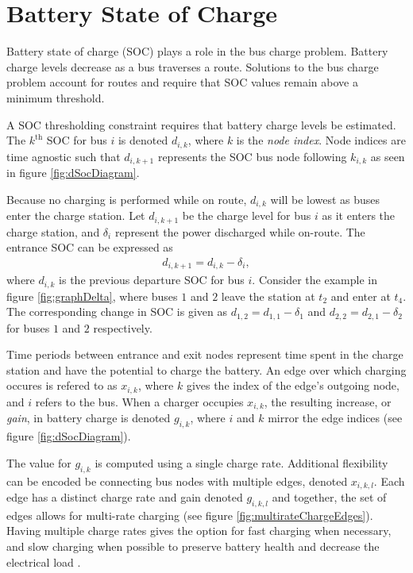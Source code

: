 \section{Battery State of Charge}
Battery state of charge (SOC) plays a role in the bus charge problem. Battery charge levels decrease as a bus traverses a route. Solutions to the bus charge problem account for routes and require that SOC values remain above a minimum threshold. 
\par A SOC thresholding constraint requires that battery charge levels be estimated. The $k^{\text{th}}$ SOC for bus $i$ is denoted $d_{i,k}$, where $k$ is the \textit{node index}. Node indices are time agnostic such that $d_{i,k+1}$ represents the SOC bus node following $k_{i,k}$ as seen in figure \ref{fig:dSocDiagram}. 
\par Because no charging is performed while on route, $d_{i,k}$ will be lowest as buses enter the charge station. Let $d_{i,k+1}$ be the charge level for bus $i$ as it enters the charge station, and $\delta_i$ represent the power discharged while on-route. The entrance SOC can be expressed as 
\begin{align}
	d_{i,k+1} = d_{i,k} - \delta_i,
\end{align}
where $d_{i,k}$ is the previous departure SOC for bus $i$. Consider the example in figure \ref{fig:graphDelta}, where buses $1$ and $2$ leave the station at $t_2$ and enter at $t_4$. The corresponding change in SOC is given as $d_{1,2} = d_{1,1} - \delta_1$ and $d_{2,2} = d_{2,1} - \delta_2$ for buses $1$ and $2$ respectively.

\par Time periods between entrance and exit nodes represent time spent in the charge station and have the potential to charge the battery. An edge over which charging occures is refered to as $x_{i,k}$, where $k$ gives the index of the edge's outgoing node, and $i$ refers to the bus.  When a charger occupies $x_{i,k}$, the resulting increase, or \textit{gain}, in battery charge is denoted $g_{i,k}$, where $i$ and $k$ mirror the edge indices (see figure \ref{fig:dSocDiagram}). 
\par The value for $g_{i,k}$ is computed using a single charge rate. Additional flexibility can be encoded be connecting bus nodes with multiple edges, denoted $x_{i,k,l}$. Each edge has a distinct charge rate and gain denoted $g_{i,k,l}$ and together, the set of edges allows for multi-rate charging (see figure \ref{fig:multirateChargeEdges}). Having multiple charge rates gives the option for fast charging when necessary, and slow charging when possible to preserve battery health and decrease the electrical load \cite{houbbadi_optimal_2019}.
